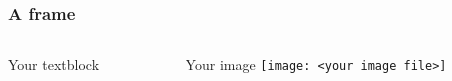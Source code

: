 \documentclass{beamer}
\begin{document}
\begin{frame}
\frametitle{A frame}


  \begin{columns}[T]

    \begin{column}{.5\textwidth}
     \begin{block}{Your textblock}
    \end{block}
    \end{column}


    \begin{column}{.5\textwidth}
    \begin{block}{Your image}
    \texttt{[image: <your image file>]}
    \end{block}
    \end{column}


  \end{columns}
\end{frame}
\end{document}
